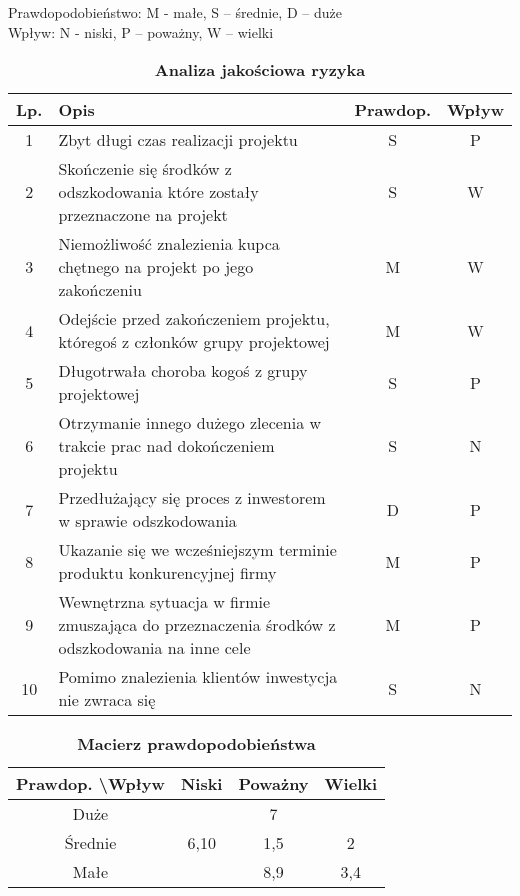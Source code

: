 Prawdopodobieństwo:  M - małe, S – średnie, D – duże\\
Wpływ: N - niski, P – poważny, W – wielki

\begin{table}[htb]
\centering
\begin{tabular}{|c|p{11.5cm}|c|c|} 
\hline Lp. & Opis & Prawdop. & Wpływ \\
\hline 1 & Zbyt długi czas realizacji projektu & S & P \\
\hline 2 & Skończenie się środków z odszkodowania które zostały przeznaczone na projekt & S & W \\
\hline 3 & Niemożliwość znalezienia kupca chętnego na projekt po jego zakończeniu & M & W \\
\hline 4 & Odejście przed zakończeniem projektu, któregoś z członków grupy projektowej & M & W \\
\hline5 & Długotrwała choroba kogoś z grupy projektowej & S & P \\
\hline6 & Otrzymanie innego dużego zlecenia w trakcie prac nad dokończeniem projektu & S & N \\
\hline7 & Przedłużający się proces z inwestorem w sprawie odszkodowania & D & P \\
\hline8 & Ukazanie się we wcześniejszym terminie produktu konkurencyjnej firmy & M & P \\
\hline9 & Wewnętrzna sytuacja w firmie zmuszająca do przeznaczenia środków z odszkodowania na inne cele  & M & P  \\
\hline10 & Pomimo znalezienia klientów inwestycja nie zwraca się &  S & N  \\
\hline
\end{tabular}
\caption{\textbf{Analiza jakościowa ryzyka}}
\label{tab:analizaJakosciowa}
\end{table}

\clearpage

\begin{table}[!h]
\centering
\begin{tabular}{|c|c|c|c|} \hline Prawdop. \textbackslash Wpływ & Niski & Poważny & Wielki \\
 \hline Duże &  & 7 &  \\
\hline Średnie & 6,10 & 1,5 & 2 \\
\hline Małe &  & 8,9  & 3,4  \\
\hline
\end{tabular}
\caption{\textbf{Macierz prawdopodobieństwa}}
\label{tab:macierzPrawdopodobienstwa}
\end{table}




